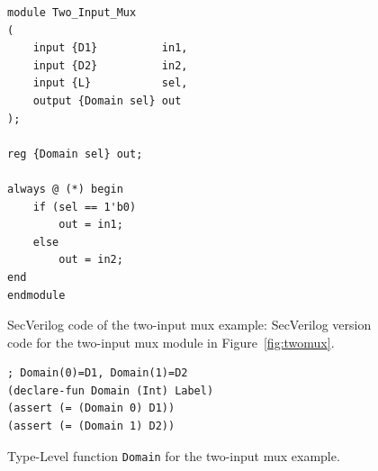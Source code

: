 \documentclass [12pt, oneside, a4paper]{article}
\newcommand{\code}[1]{\texttt{#1}}
\begin{document}
{%
\begin{figure}
\centering
\begin{minipage}{.8\linewidth}
\begin{lstlisting}
module Two_Input_Mux
(
	input {D1}          in1,
	input {D2}          in2,
	input {L}           sel,
	output {Domain sel} out
);

reg	{Domain sel} out;

always @ (*) begin
	if (sel == 1'b0)
		out = in1;
	else
		out = in2;
end
endmodule
\end{lstlisting}
\end{minipage}
\caption{SecVerilog code of the two-input mux example: SecVerilog
version code for the two-input mux module in Figure~\ref{fig:twomux}.}
\label{fig:sectwomux}
\end{figure}

\begin{figure}
\centering
\begin{minipage}{.8\linewidth}
\begin{lstlisting}[framexbottommargin=0pt, language=z3, numbers=none,
framexleftmargin=0pt, xleftmargin=0pt]
; Domain(0)=D1, Domain(1)=D2
(declare-fun Domain (Int) Label)
(assert (= (Domain 0) D1))
(assert (= (Domain 1) D2))
\end{lstlisting}
\end{minipage}
\caption{Type-Level function \code{Domain} for the two-input mux example.}
\label{fig:diamond}
\end{figure}

}
\end{document}
